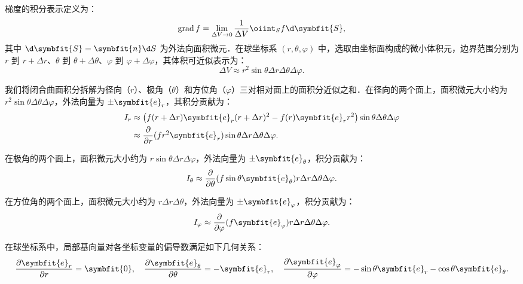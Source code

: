 \begin{solution}
    梯度的积分表示定义为：
    \begin{equation}
        \operatorname{grad} f = \lim_{\Delta V \to 0} \frac{1}{\Delta V} \oiint_{S} f \d \symbfit{S},
    \end{equation}
    其中 $\d \symbfit{S} = \symbfit{n} \d S$ 为外法向面积微元．在球坐标系 $(r, \theta, \varphi)$ 中，选取由坐标面构成的微小体积元，边界范围分别为 $r$ 到 $r+\Delta r$、$\theta$ 到 $\theta+\Delta \theta$、$\varphi$ 到 $\varphi+\Delta \varphi$，其体积可近似表示为：
    \begin{equation}
        \Delta V \approx r^2 \sin\theta \Delta r \Delta \theta \Delta \varphi.
    \end{equation}

    我们将闭合曲面积分拆解为径向（$r$）、极角（$\theta$）和方位角（$\varphi$）三对相对面上的面积分近似之和．在径向的两个面上，面积微元大小约为 $r^2 \sin\theta \Delta \theta \Delta \varphi$，外法向量为 $\pm \symbfit{e}_r$，其积分贡献为：
    \begin{equation}
        \begin{aligned}
            I_r & \approx \left( f(r+\Delta r) \symbfit{e}_r(r+\Delta r)^2 - f(r) \symbfit{e}_r r^2 \right) \sin\theta \Delta \theta \Delta \varphi \\
                & \approx \frac{\partial}{\partial r} (f r^2 \symbfit{e}_r) \sin\theta \Delta r \Delta \theta \Delta \varphi.
        \end{aligned}
    \end{equation}

    在极角的两个面上，面积微元大小约为 $r \sin\theta \Delta r \Delta \varphi$，外法向量为 $\pm \symbfit{e}_\theta$，积分贡献为：
    \begin{equation}
        I_\theta \approx \frac{\partial}{\partial \theta} (f \sin\theta \symbfit{e}_\theta) r \Delta r \Delta \theta \Delta \varphi.
    \end{equation}

    在方位角的两个面上，面积微元大小约为 $r \Delta r \Delta \theta$，外法向量为 $\pm \symbfit{e}_\varphi$，积分贡献为：
    \begin{equation}
        I_\varphi \approx \frac{\partial}{\partial \varphi} (f \symbfit{e}_\varphi) r \Delta r \Delta \theta \Delta \varphi.
    \end{equation}

    在球坐标系中，局部基向量对各坐标变量的偏导数满足如下几何关系：
    \begin{equation}
        \label{eq:base-vector-deriv}
        \frac{\partial \symbfit{e}_r}{\partial r} = \symbfit{0}, \quad \frac{\partial \symbfit{e}_\theta}{\partial \theta} = -\symbfit{e}_r, \quad \frac{\partial \symbfit{e}_\varphi}{\partial \varphi} = -\sin\theta \symbfit{e}_r - \cos\theta \symbfit{e}_\theta.
    \end{equation}


\end{solution}

